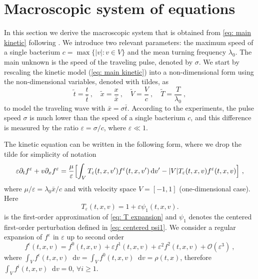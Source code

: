 \documentclass[11pt,twoside]{article}
\numberwithin{equation}{section}
\newcommand*\diff{\mathop{}\!\mathrm{d}}
\theoremstyle{plain}
\theoremstyle{nonumberplain}
\newcommand{\e}{\epsilon}
\begin{document}
\section{Macroscopic system of equations}\label{sec: maro system}
In this section we derive the macroscopic system that is obtained from \eqref{eq: main kinetic} following \cite{saragosti2010mathematical}. We introduce two relevant parameters: the maximum speed of a single bacterium $c = \max\{|v|: v \in V\}$ and the mean turning frequency $\lambda_0$.
The main unknown is the speed of the traveling pulse, denoted by $\sigma$. We start by rescaling the kinetic model (\ref{eq: main kinetic}) into a non-dimensional form using the non-dimensional variables, denoted with tildes, as
\begin{equation}
    \tilde{t}= \frac{{t}}{\bar{t}}\ , \quad \tilde{x} = \frac{x}{\bar{x}}\ , \quad {\tilde{V} = \frac{V}{c}}\ , \quad \tilde{T}=\frac{T}{\lambda_0}\ ,
    \nonumber
\end{equation}
to model the traveling wave with $\bar{x} = \sigma\bar{t}$. According to the experiments, the pulse
speed $\sigma$ is much lower than the speed of a single bacterium $c$, and this difference is measured by the ratio $\varepsilon = \sigma / c$, where $\varepsilon \ll 1$.



The kinetic equation can be written in the following form, where we  drop the tilde for simplicity of notation 
{
\begin{equation}
    \varepsilon \partial_t f^\varepsilon+{v}\partial_x f^\varepsilon = \frac{\mu}{\varepsilon}\Bigl[\int_V T_\varepsilon(t,x,v')f^\varepsilon(t,x,v')\diff v'-|V|T_\varepsilon(t,x,v)f^\varepsilon(t,x,v)\Bigr]\ , \label{eq: inital model with scaling}
\end{equation}}where $\mu/\varepsilon=\lambda_0 \bar{x}/c$ and with velocity space \( V = [-1,1] \) (one-dimensional case). 
Here 
\begin{equation}\label{eq: T app}
T_\varepsilon(t,x,v)
=
1+\varepsilon\psi_1(t,x,v).
\end{equation} 
is the first-order approximation of \eqref{eq: T expansion}
{and \(\psi_1\) denotes the centered first-order perturbation defined in \eqref{eq: centered psi1}.}
We consider a regular expansion of $f^\varepsilon$ in $\varepsilon$ up to second order
\begin{equation*}
f^\e(t,{x},{v})=f^0(t,{x},{v})+\varepsilon f^1(t,{x},{v})+\varepsilon^2 f^2(t,{x},{v})+\mathcal{O}(\varepsilon^3)\ , 
\end{equation*}
where $\int_V f^\e(t,{x},{v})\diff {v} = \int_V f^0(t,{x},{v})\diff {v} = \rho(t,{x})$, therefore $\int_V f^i(t,{x},{v})\diff {v}=0$, $\forall i\geq 1$.
\end{document}
